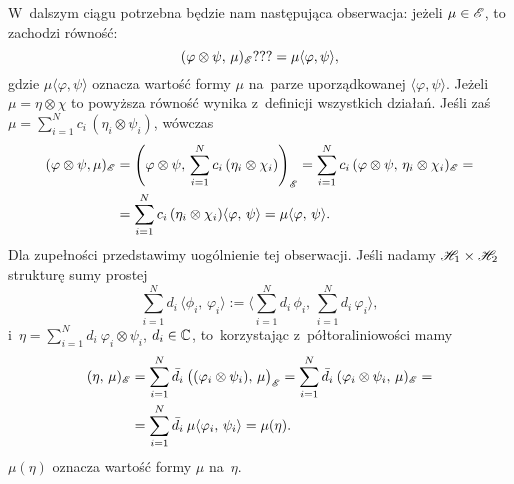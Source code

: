\documentclass[a4paper,11pt]{article}
\numberwithin{equation}{section}
\begin{document}
W~dalszym ciągu potrzebna będzie nam następująca obserwacja: jeżeli
$\mu \in \mathcal{E}$, to zachodzi równość:
\begin{equation}
  \label{eq:RS-Vol-I-s01-33}
  ( \varphi \otimes \psi, \, \mu )_{ \mathcal{E} } ??? = \mu\langle \varphi, \psi \rangle,
\end{equation}
gdzie $\mu\langle \varphi,  \psi \rangle$ oznacza wartość formy $\mu$ na~parze
uporządkowanej $\langle \varphi, \psi \rangle$. Jeżeli $\mu = \eta \otimes \chi$ to
powyższa równość wynika z~definicji wszystkich działań. Jeśli zaś
$\mu = \sum_{ i = 1 }^{ N } c_{ i } \, ( \eta_{ i } \otimes \psi_{ i } )$,
wówczas
\begin{equation}
  \label{eq:RS-Vol-I-s01-34}
  \begin{split}
    ( \varphi \otimes \psi, \mu )_{ \mathcal{E} }
    &=
      \left( \varphi \otimes \psi, \, \sum_{ i = 1 }^{ N } c_{ i } \,
      ( \eta_{ i } \otimes \chi_{ i } ) \right)_{ \mathcal{E} }
      =
      \sum_{ i = 1 }^{ N } c_{ i } \,
      ( \varphi \otimes \psi, \, \eta_{ i } \otimes \chi_{ i } )_{ \mathcal{E} } = \\
    &=
      \sum_{ i = 1 }^{ N } c_{ i } \, ( \eta_{ i } \otimes \chi_{ i } )
      \langle \varphi, \, \psi \rangle
      = \mu\langle \varphi, \, \psi \rangle.
  \end{split}
\end{equation}
Dla zupełności przedstawimy uogólnienie tej obserwacji. Jeśli nadamy
$\mathcal{H}_{ 1 } \times \mathcal{H}_{ 2 }$ strukturę sumy prostej
\begin{equation}
  \label{eq:RS-Vol-I-s01-35}
  \sum_{ i = 1 }^{ N } d_{ i } \, \langle \phi_{ i }, \, \varphi_{ i } \rangle
  :=
  \langle \sum_{ i = 1 }^{ N } d_{ i } \, \phi_{ i }, \,
  \sum_{ i = 1 }^{ N } d_{ i } \, \varphi_{ i } \rangle,
\end{equation}
i~$\eta = \sum_{ i = 1 }^{ N } d_{ i } \: \varphi_{ i } \otimes \psi_{ i }$,
$d_{ i } \in \mathbb{C}$, to~korzystając z~półtoraliniowości mamy
\begin{equation}
  \label{eq:RS-Vol-I-s01-36}
  \begin{split}
    ( \eta, \, \mu )_{ \mathcal{E} }
    &=
      \sum_{ i = 1 }^{ N } \bar{ d }_{ i } \:
      \big( ( \varphi_{ i } \otimes \psi_{ i } ), \, \mu \big)_{ \mathcal{E} }
      =
      \sum_{ i = 1 }^{ N } \bar{ d }_{ i } \:
    ( \varphi_{ i } \otimes \psi_{ i }, \, \mu )_{ \mathcal{E} } = \\
    &=
      \sum_{ i = 1 }^{ N } \bar{ d }_{ i } \: \mu \langle \varphi_{ i }, \, \psi_{ i } \rangle
      = \mu( \eta ).
  \end{split}
\end{equation}
$\mu( \eta )$ oznacza wartość formy $\mu$ na~$\eta$.
\end{document}
